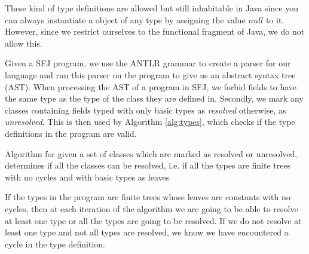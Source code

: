 \documentclass{l4proj}
\begin{document}
These kind of type definitions are allowed but still inhabitable in Java since you can always instantiate a object of any type by assigning the value $null$ to it.
However, since we restrict ourselves to the functional fragment of Java, we do not allow this.

Given a SFJ program, we use the ANTLR grammar to create a parser for our language and run this parser on the program to give us an abstract syntax tree (AST).
When processing the AST of a program in SFJ, we forbid fields to have the same type as the type of the class they are defined in.
Secondly, we mark any classes containing fields typed with only basic types as \emph{resolved} otherwise, as \emph{unresolved}.
This is then used by Algorithm \ref{alg:types}, which checks if the type definitions in the program are valid.

\begin{algorithm}
    \DontPrintSemicolon

\caption{Algorithm for given a set of classes which are marked as resolved or unresolved, determines if all the classes can be resolved, i.e. if all the types are finite trees with no cycles and with basic types as leaves}
\label{alg:types}
\end{algorithm}

If the types in the program are finite trees whose leaves are constants with no cycles, then at each iteration of the algorithm we are going to be able to resolve at least one type or all the types are going to be resolved.
If we do not resolve at least one type and not all types are resolved, we know we have encountered a cycle in the type definition.
\end{document}
